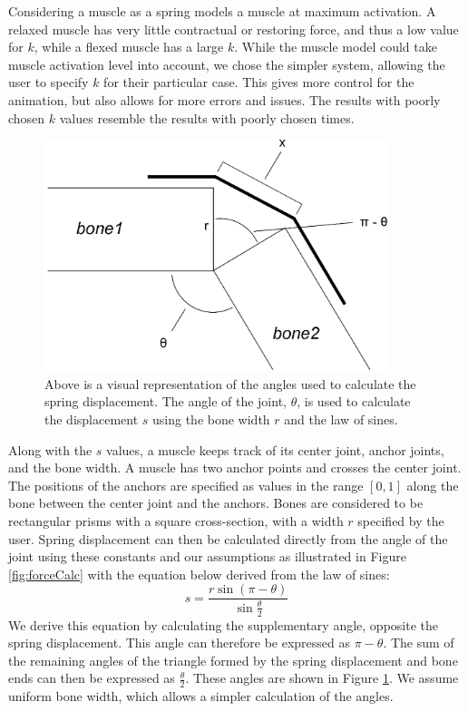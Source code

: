 Considering a muscle as a spring models a muscle at maximum activation.  A relaxed muscle has very little contractual or restoring force, and thus a low value for $k$, while a flexed muscle has a large $k$.  While the muscle model could take muscle activation level into account, we chose the simpler system, allowing the user to specify $k$ for their particular case.  This gives more control for the animation, but also allows for more errors and issues.  The results with poorly chosen $k$ values resemble the results with poorly chosen times.

\begin{figure}[ht]
	\centering
	\includegraphics[width=10cm]{images/spring_calc/angle_diag.eps}
	\caption[Diagram of spring displacement calculation]{Above is a visual representation of the angles used to calculate the spring displacement.  The angle of the joint, $\theta$, is used to calculate the displacement $s$ using the bone width $r$ and the law of sines.}
	\label{fig:angleDiag}
\end{figure}

Along with the $s$ values, a muscle keeps track of its center joint, anchor joints, and the bone width.  A muscle has two anchor points and crosses the center joint.  The positions of the anchors are specified as values in the range $[0,1]$ along the bone between the center joint and the anchors.  Bones are considered to be rectangular prisms with a square cross-section, with a width $r$ specified by the user.  Spring displacement can then be calculated directly from the angle of the joint using these constants and our assumptions as illustrated in Figure \ref{fig:forceCalc} with the equation below derived from the law of sines:
\[ 
	s = \dfrac{r\sin\left(\pi - \theta \right)}{\sin\frac{\theta}{2}}
\]
We derive this equation by calculating the supplementary angle, opposite the spring displacement.  This angle can therefore be expressed as $\pi - \theta$. The sum of the remaining angles of the triangle formed by the spring displacement and bone ends can then be expressed as $\frac{\theta}{2}$.  These angles are shown in Figure \ref{fig:angleDiag}. We assume uniform bone width, which allows a simpler calculation of the angles.

